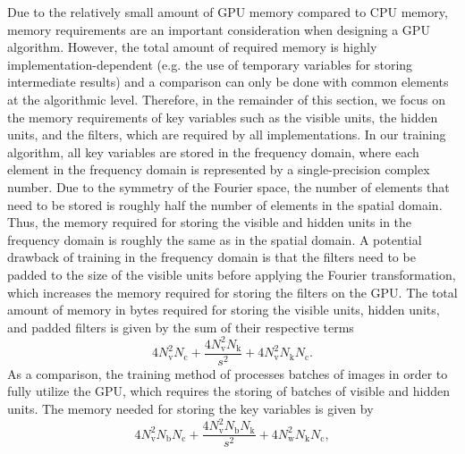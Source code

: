 Due to the relatively small amount of GPU memory compared to CPU memory, memory
requirements are an important consideration when designing a GPU algorithm.
However, the total amount of required memory is highly implementation-dependent
(e.g. the use of temporary variables for storing intermediate results) and a
comparison can only be done with common elements at the algorithmic level.
Therefore, in the remainder of this section, we focus on the memory requirements
of key variables such as the visible units, the hidden units, and the filters,
which are required by all implementations. In our training algorithm, all key
variables are stored in the frequency domain, where each element in the
frequency domain is represented by a single-precision complex number. Due to the
symmetry of the Fourier space, the number of elements that need to be stored is
roughly half the number of elements in the spatial domain. Thus, the memory
required for storing the visible and hidden units in the frequency domain is
roughly the same as in the spatial domain. A potential drawback of training in
the frequency domain is that the filters need to be padded to the size of the
visible units before applying the Fourier transformation, which increases the
memory required for storing the filters on the GPU. The total amount of memory
in bytes required for storing the visible units, hidden units, and padded
filters is given by the sum of their respective terms
\begin{equation} 
4N_\text{v}^2N_\text{c} + \frac{4N_\text{v}^2 N_\text{k}}{s^2} +
4N_\text{v}^2N_\text{k}N_\text{c}.
\end{equation}
As a comparison, the training method of \citet{krizhevsky2012} processes
batches of images in order to fully utilize the GPU, which requires the storing of
batches of visible and hidden units. The memory needed for storing the key
variables is given by
\begin{equation} 
4N_\text{v}^2 N_\text{b}N_\text{c} + \frac{4N_\text{v}^2
N_\text{b}N_\text{k}}{s^2} + 4N_\text{w}^2N_\text{k}N_\text{c},
\end{equation}

